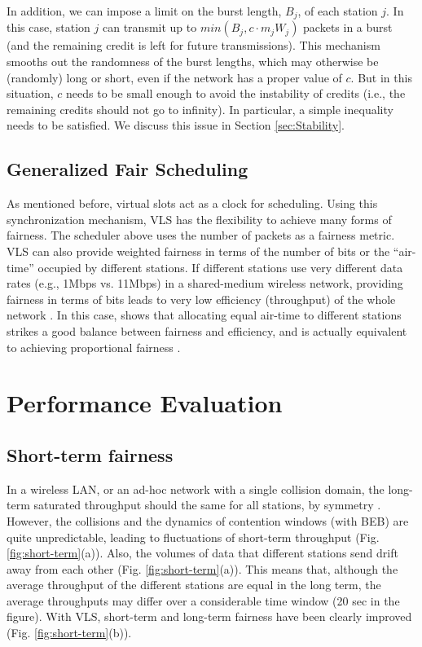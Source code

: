 \documentclass[letterpaper, 10 pt, conference]{ieeeconf}
\begin{document}
In addition, we can impose a limit on the burst length, $B_{j}$, of each
station $j$. In this case, station $j$ can transmit up to $min(B_{j},c\cdot m_{j}W_{j})$
packets in a burst (and the remaining credit is left for future transmissions). This mechanism smooths out the randomness of the burst lengths,
which may otherwise be (randomly) long or short, even if the
network has a proper value of $c$. But in this situation, $c$ needs to be
small enough to avoid the instability of credits (i.e., the remaining credits 
should not go to infinity). In particular, a
simple inequality needs to be satisfied. We discuss this issue
in Section \ref{sec:Stability}.



\subsection{\label{sub:Generalized-Fair-Scheduling}Generalized Fair Scheduling}

As mentioned before, virtual slots act as a clock for scheduling.
Using this synchronization mechanism, VLS has the flexibility to achieve many forms of
fairness. The scheduler above uses the number of packets as a fairness metric.
VLS can also provide weighted fairness in terms of the number of bits
or the {}``air-time'' occupied by different stations. If different
stations use very different data rates (e.g., 1Mbps vs. 11Mbps) in
a shared-medium wireless network, providing fairness in terms of bits
leads to very low efficiency (throughput) of the whole network \cite{PF_Jiang}.
In this case, \cite{PF_Jiang} shows that allocating equal air-time
to different stations strikes a good balance between fairness and
efficiency, and is actually equivalent to achieving proportional fairness
\cite{kelly97charging}.

\section{Performance Evaluation}


\subsection{Short-term fairness}

In a wireless LAN, or an ad-hoc network with a single collision domain,
the long-term saturated throughput should the same for all stations, by symmetry \cite{Bianchi}.
However, the collisions and the dynamics of contention windows (with
BEB) are quite unpredictable, leading to fluctuations of short-term
throughput (Fig. \ref{fig:short-term}(a)). Also, the volumes of data
that different stations send drift away from each other (Fig. \ref{fig:short-term}(a)).
This means that, although the average throughput of the different stations
are equal in the long term, the average throughputs may differ over a
considerable time window (20 sec in the figure). With VLS, short-term
and long-term fairness have been clearly improved (Fig. \ref{fig:short-term}(b)).
\end{document}
